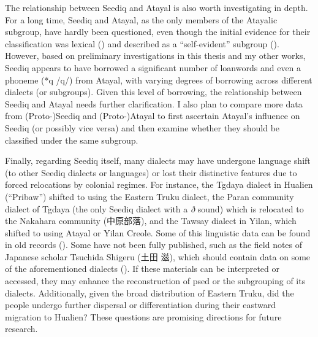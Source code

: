 The relationship between Seediq and Atayal is also worth investigating in depth. For a long time, Seediq and Atayal, as the only members of the Atayalic subgroup, have hardly been questioned, even though the initial evidence for their classification was lexical (\cite{ferrell1969}) and described as a ``self-evident'' subgroup (\cite{blust1999subgrouping}). However, based on preliminary investigations in this thesis and my other works, Seediq appears to have borrowed a significant number of loanwords and even a phoneme (*q /q/) from Atayal, with varying degrees of borrowing across different dialects (or subgroups). Given this level of borrowing, the relationship between Seediq and Atayal needs further clarification. I also plan to compare more data from (Proto-)Seediq and (Proto-)Atayal to first ascertain Atayal's influence on Seediq (or possibly vice versa) and then examine whether they should be classified under the same subgroup.

Finally, regarding Seediq itself, many dialects may have undergone language shift (to other Seediq dialects or languages) or lost their distinctive features due to forced relocations by colonial regimes. For instance, the Tgdaya dialect in Hualien (``Pribaw'') shifted to using the Eastern Truku dialect, the Paran community dialect of Tgdaya (the only Seediq dialect with a \textit{ð} sound) which is relocated to the Nakahara community (中原部落), and the Tawsay dialect in Yilan, which shifted to using Atayal or Yilan Creole. Some of this linguistic data can be found in old records (\cite{tashiro1900easterntw, bullock1874formosan}). Some have not been fully published, such as the field notes of Japanese scholar Tsuchida Shigeru (土田 滋), which should contain data on some of the aforementioned dialects (\cite{li2022tsuchida}). If these materials can be interpreted or accessed, they may enhance the reconstruction of \acl{psed} or the subgrouping of its dialects. Additionally, given the broad distribution of Eastern Truku, did the people undergo further dispersal or differentiation during their eastward migration to Hualien? These questions are promising directions for future research.